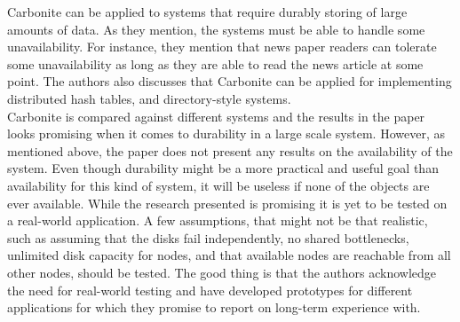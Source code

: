 \documentclass{article}
\begin{document}
\noindent Carbonite can be applied to systems that require durably storing of large amounts of data. As they mention, the systems must be able to handle some unavailability. For instance, they mention that news paper readers can tolerate some unavailability as long as they are able to read the news article at some point. The authors also discusses that Carbonite can be applied for implementing distributed hash tables, and directory-style systems.\\

\noindent Carbonite is compared against different systems and the results in the paper looks promising when it comes to durability in a large scale system. However, as mentioned above, the paper does not present any results on the availability of the system. Even though durability might be a more practical and useful goal than availability for this kind of system, it will be useless if none of the objects are ever available. While the research presented is promising it is yet to be tested on a real-world application. A few assumptions, that might not be that realistic, such as assuming that the disks fail independently, no shared bottlenecks, unlimited disk capacity for nodes, and that available nodes are reachable from all other nodes, should be tested. The good thing is that the authors acknowledge the need for real-world testing and have developed prototypes for different applications for which they promise to report on long-term experience with.\\
\end{document}
